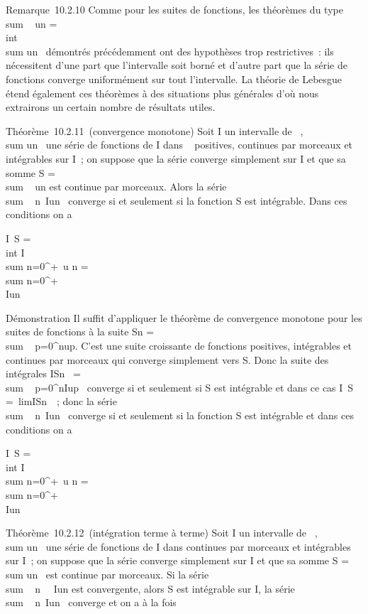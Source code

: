 Remarque~10.2.10 Comme pour les suites de fonctions, les théorèmes du
type \\sum ~
\int  un =\\int ~
\\sum  un~
démontrés précédemment ont des hypothèses trop restrictives~: ils
nécessitent d'une part que l'intervalle soit borné et d'autre part que
la série de fonctions converge uniformément sur tout l'intervalle. La
théorie de Lebesgue étend également ces théorèmes à des situations plus
générales d'où nous extrairons un certain nombre de résultats utiles.

Théorème~10.2.11~(convergence monotone) Soit I un intervalle de ~,
\\sum  un~ une
série de fonctions de I dans ~ positives, continues par morceaux et
intégrables sur I~; on suppose que la série converge simplement sur I et
que sa somme S = \\sum ~
un est continue par morceaux. Alors la série
\\sum ~
n\in{}~\int  Iun~ converge
si et seulement si la fonction S est intégrable. Dans ces conditions on
a

\int  I~S =\\int
 I \\sum
n=0^+\infty~u n = \\sum
n=0^+\infty~\\\int
  Iun

Démonstration Il suffit d'appliquer le théorème de convergence monotone
pour les suites de fonctions à la suite Sn
= \\sum ~
p=0^nup. C'est une suite croissante de
fonctions positives, intégrables et continues par morceaux qui converge
simplement vers S. Donc la suite des intégrales
\int  ISn~
= \\sum ~
p=0^n\int  Iup~
converge si et seulement si S est intégrable et dans ce cas
\int  I~S =\
lim\int  ISn~~; donc la
série \\sum ~
n\in{}~\int  Iun~ converge
si et seulement si la fonction S est intégrable et dans ces conditions
on a

\int  I~S =\\int
 I \\sum
n=0^+\infty~u n = \\sum
n=0^+\infty~\\\int
  Iun

Théorème~10.2.12~(intégration terme à terme) Soit I un intervalle de ~,
\\sum  un~ une
série de fonctions de I dans  continues par morceaux et intégrables sur
I~; on suppose que la série converge simplement sur I et que sa somme S
= \\sum  un~
est continue par morceaux. Si la série
\\sum ~
n\in{}~\int ~
I\textbar{}un\textbar{} est convergente, alors S est
intégrable sur I, la série
\\sum ~
n\in{}~\int  Iun~ converge
et on a à la fois

